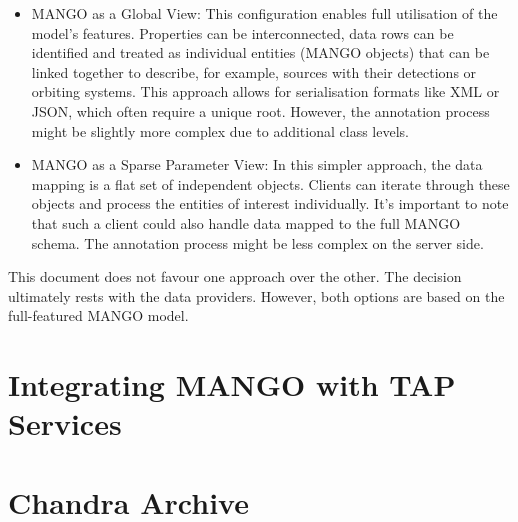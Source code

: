 \documentclass[11pt,a4paper]{ivoa}
\begin{document}
\begin{itemize}[noitemsep,topsep=0pt,parsep=0pt,partopsep=0pt]
    \item MANGO as a Global View: This configuration enables full utilisation of the 
          model's features. Properties can be interconnected, data rows can be identified
          and treated as individual entities (MANGO objects) that can be linked together to describe,
          for example, sources with their detections or orbiting systems.
          This approach allows for serialisation formats like XML or JSON, which often require
          a unique root.
          However, the annotation process might be slightly more complex due to additional class levels.
    \item MANGO as a Sparse Parameter View: In this simpler approach, the data mapping is a
          flat set of independent objects. Clients can iterate through these objects and process
          the entities of interest individually.
          It's important to note that such a client could also handle data mapped to the full MANGO schema.
          The annotation process might be less complex on the server side.
\end{itemize}

This document does not favour one approach over the other.
The decision ultimately rests with the data providers.
However, both options are based on the full-featured MANGO model.




\section{Integrating MANGO with TAP Services}


\pagebreak
\appendix

% 

% 

\section{Chandra Archive}
\label{sec:chandra} 

\end{document}
